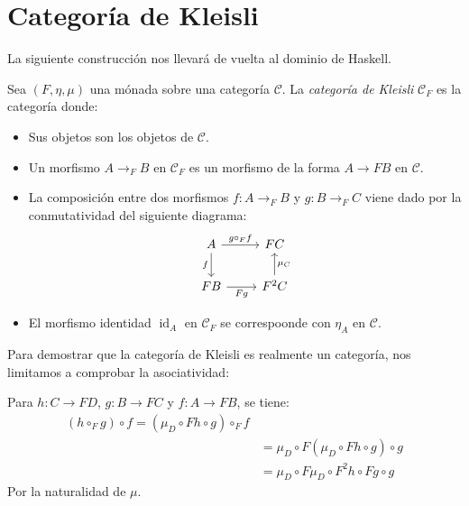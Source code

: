 \documentclass[12pt, twoside]{book}
\newcommand{\cat}{{\mathcal{C}}}
\DeclareMathOperator{\id}{id}
\begin{document}
\section{Categoría de Kleisli}
La siguiente construcción nos llevará de vuelta al dominio de Haskell.
\begin{definition}
Sea $(F,\eta,\mu)$ una mónada sobre una categoría $\cat$.
La \emph{categoría de Kleisli} $\cat_F$ es la categoría donde:
\begin{itemize}
  \item Sus objetos son los objetos de $\cat$.
  \item Un morfismo $A \to_F B$ en $\cat_F$ es un morfismo de la forma $A \to F B$ en $\cat$.
  \item La composición entre dos morfismos $f \colon A \to_F B$ y $g \colon B \to_F C$ viene dado por la conmutatividad del siguiente diagrama:
  \[ \begin{tikzcd}
  A \arrow[r,"g \circ_F f"] \arrow[d,"f" left] & {F C}\\
  {F B} \arrow[r,"F g" below] & F^2 C \arrow[u,"\mu_C" right]
  \end{tikzcd}\]
  \item El morfismo identidad $\id_A$ en $\cat_F$ se correspoonde con $\eta_A$ en $\cat$.
\end{itemize}
\end{definition}
Para demostrar que la categoría de Kleisli es realmente un categoría, nos limitamos a comprobar la asociatividad:

Para $h \colon C \to F D$, $g \colon B \to F C$ y $f \colon A \to F B$, se tiene:
\begin{align*}
(h \circ_F g) \circ f = (\mu_D \circ F h \circ g) \circ_F f\\
& = \mu_D \circ F(\mu_D \circ F h \circ g)\circ g\\
& = \mu_D \circ F\mu_D \circ F^2 h \circ F g \circ g
\end{align*}
Por la naturalidad de $\mu$.
\end{document}
